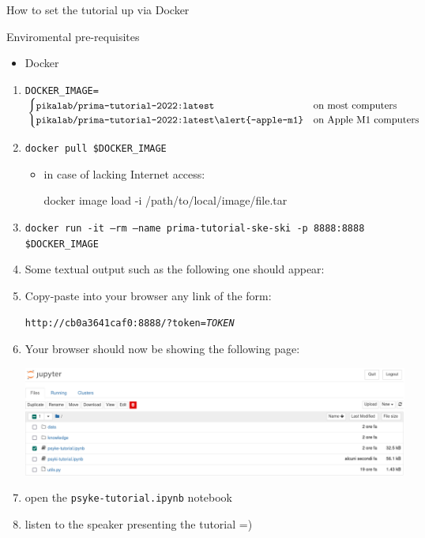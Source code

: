 \documentclass[presentation]{beamer}\mode<presentation>{\usetheme{AMSBolognaFC}}
\begin{document}
\begin{frame}[allowframebreaks]{How to set the tutorial up via Docker}

    \begin{block}{Enviromental pre-requisites}
        \begin{itemize}
            \item Docker
        \end{itemize}
    \end{block}

    \begin{enumerate}
        \item \texttt{DOCKER\_IMAGE=}$\begin{cases}
            \texttt{pikalab/prima-tutorial-2022:latest} & \text{on most computers}
            \\
            \texttt{pikalab/prima-tutorial-2022:latest\alert{-apple-m1}} & \text{on Apple M1 computers}
        \end{cases}$
        \item \texttt{docker pull \$DOCKER\_IMAGE}
        \begin{itemize}
            \item in case of lacking Internet access:
            \begin{center}\ttfamily
                docker image load -i /path/to/local/image/file.tar
            \end{center}
        \end{itemize}
        \item \texttt{docker run -it --rm --name prima-tutorial-ske-ski -p 8888:8888 \$DOCKER\_IMAGE}
        \item Some textual output such as the following one should appear:
        
        \framebreak
        \item Copy-paste into your browser any link of the form: 
        \begin{center}
            \alert{\texttt{http://cb0a3641caf0:8888/?token=\textit{TOKEN}}}
        \end{center}
        \item Your browser should now be showing the following page:
        \begin{center}
            \includegraphics[width=.7\linewidth]{figures/jupyter-docker.png}
        \end{center}
        \item open the \texttt{psyke-tutorial.ipynb} notebook
        \item listen to the speaker presenting the tutorial =)
    \end{enumerate}
\end{frame}
\end{document}
